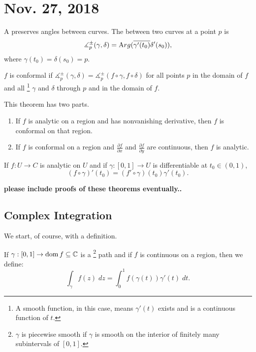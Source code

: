 \documentclass[notes]{subfile}
\begin{document}
\section{Nov. 27, 2018}

A  preserves angles between curves.
The  between two curves at a point $p$ is 
\[ \measuredangle_p^{\pm}(\gamma, \delta) = 
{\text Arg} (\overline{\gamma'(t_0)} \delta'(s_0)),\]
where $\gamma(t_0) = \delta(s_0) = p$.

\begin{definition}
    $f$ is conformal if $\measuredangle_p^{\pm}(\gamma, \delta) = \measuredangle_p^{\pm}(f \circ \gamma, f \circ \delta)$ 
    for all points $p$ in the domain of $f$ and all \footnote{A smooth function, in this case, means
    $\gamma'(t)$ exists and is a continuous function of $t$.} $\gamma$
    and $\delta$ through $p$ and in the domain of $f$.
\end{definition}
 
\begin{theorem}
    This theorem has two parts.
    \begin{enumerate}
        \item If $f$ is analytic on a region and has nonvanishing
            derivative, then $f$ is conformal on that region.

        \item If $f$ is conformal on a region and 
            $\frac{\partial f}{\partial x}$ and 
            $\frac{\partial f}{\partial y}$ are continuous,
            then $f$ is analytic.
    \end{enumerate}
\end{theorem}

\begin{lemma}
    If $f : U \to C$ is analytic on $U$ and if $\gamma : [0,1]
    \to U$ is differentiable at $t_0 \in (0,1)$,
    \[ (f \circ \gamma)' (t_0) = (f' \circ \gamma) (t_0)
    \gamma'(t_0). \]
\end{lemma}

\textbf{please include proofs of these theorems eventually..}



\subsection{Complex Integration}
We start, of course, with a definition.

\begin{definition}
    If $\gamma: [0,1] \to \operatorname{dom}{f} \subseteq \operatorname{\mathbb{C}}$ is a 
    \footnote{$\gamma$ is piecewise 
    smooth if $\gamma$ is smooth on the interior of finitely
    many subintervals of $[0,1]$.}
    path and if $f$ is continuous on a region,
    then we define:
    \[ \int_{\gamma} f(z) \; dz = \int_0^1 f(\gamma(t))\gamma'(t) \;dt. \]

\end{definition}
\end{document}
